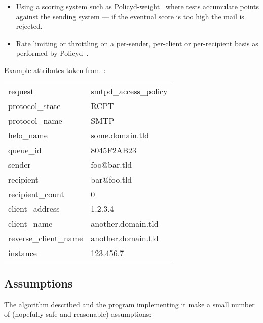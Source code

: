 \documentclass[a4paper,12pt,draft]{article}
\begin{document}
\begin{itemize}
    \item Using a scoring system such as
        Policyd-weight~\cite{policyd-weight} where tests accumulate points
        against the sending system --- if the eventual score is too high
        the mail is rejected.
        
    \item Rate limiting or throttling on a per-sender, per-client or
        per-recipient basis as performed by Policyd~\cite{policyd}.

\end{itemize}

Example attributes taken from~\cite{policy-servers}:

\begin{tabular}[]{ll}

    request                 & smtpd\_access\_policy     \\
    protocol\_state         & RCPT                      \\
    protocol\_name          & SMTP                      \\
    helo\_name              & some.domain.tld           \\
    queue\_id               & 8045F2AB23                \\
    sender                  & foo@bar.tld               \\
    recipient               & bar@foo.tld               \\
    recipient\_count        & 0                         \\
    client\_address         & 1.2.3.4                   \\
    client\_name            & another.domain.tld        \\
    reverse\_client\_name   & another.domain.tld        \\
    instance                & 123.456.7                 \\

\end{tabular}



\subsection{Assumptions}

The algorithm described and the program implementing it make a small number
of (hopefully safe and reasonable) assumptions:
\end{document}
